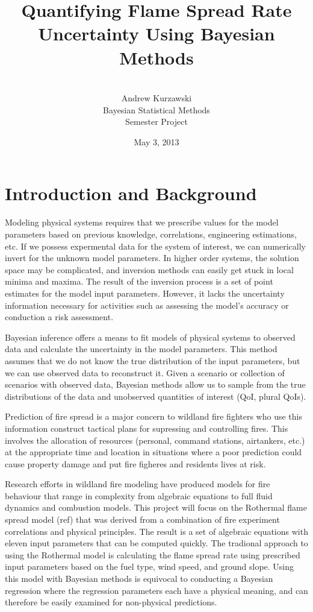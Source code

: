 \documentclass[11pt]{article}
\title{Quantifying Flame Spread Rate Uncertainty Using Bayesian Methods}
\author{
        \\
        Andrew Kurzawski \\
        Bayesian Statistical Methods \\ 
        Semester Project \\
}
\date{May 3, 2013}
\begin{document}
\maketitle

\clearpage

\pagestyle{plain}


\section{Introduction and Background}

Modeling physical systems requires that we prescribe values for the model parameters based on previous knowledge, correlations, engineering estimations, etc. If we possess expermental data for the system of interest, we can numerically invert for the unknown model parameters. In higher order systems, the solution space may be complicated, and inversion methods can easily get stuck in local minima and maxima. The result of the inversion process is a set of point estimates for the model input parameters. However, it lacks the uncertainty information necessary for activities such as assessing the model's accuracy or conduction a risk assessment.

Bayesian inference offers a means to fit models of physical systems to observed data and calculate the uncertainty in the model parameters. This method assumes that we do not know the true distribution of the input parameters, but we can use observed data to reconstruct it. Given a scenario or collection of scenarios with observed data, Bayesian methods allow us to sample from the true distributions of the data and unobserved quantities of interest (QoI, plural QoIs).

Prediction of fire spread is a major concern to wildland fire fighters who use this information construct tactical plans for supressing and controlling fires. This involves the allocation of resources (personal, command stations, airtankers, etc.) at the appropriate time and location in situations where a poor prediction could cause property damage and put fire figheres and residents lives at risk.

Research efforts in wildland fire modeling have produced models for fire behaviour that range in complexity from algebraic equations to full fluid dynamics and combustion models. This project will focus on the Rothermal flame spread model (ref) that was derived from a combination of fire experiment correlations and physical principles. The result is a set of algebraic equations with eleven input parameters that can be computed quickly. The tradional approach to using the Rothermal model is calculating the flame spread rate using prescribed input parameters based on the fuel type, wind speed, and ground slope. Using this model with Bayesian methods is equivocal to conducting a Bayesian regression where the regression parameters each have a physical meaning, and can therefore be easily examined for non-physical predictions.
\end{document}
